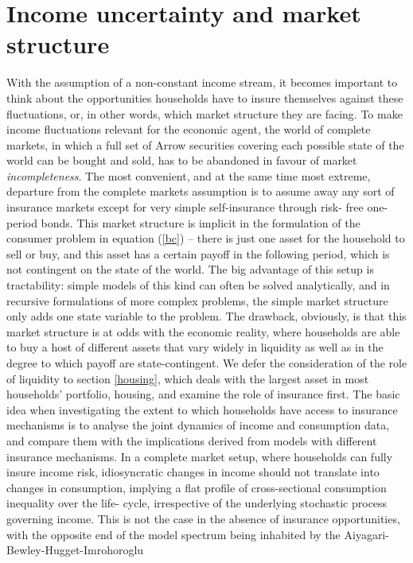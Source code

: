 \section{Income uncertainty and market structure}
With the assumption of a non-constant income stream, it becomes important to 
think about the opportunities households have to insure themselves against
these fluctuations, or, in other words, which market structure they are facing.
To make income fluctuations relevant for the economic agent, the world of 
complete markets, in which a full set of Arrow securities covering each possible
state of the world can be bought and sold, has to be abandoned in favour of 
market \textit{incompleteness}. The most convenient, and at the same time most
extreme, departure from the complete markets assumption is to assume away any
sort of insurance markets except for very simple self-insurance through risk-
free one-period bonds. This market structure is implicit in the formulation of
the consumer problem in equation (\ref{bc}) -- there is just one asset for the 
household to sell or buy, and this asset has a certain payoff in the following 
period, which is not contingent on the state of the world. The big advantage of 
this setup is tractability: simple models of this kind can often be solved 
analytically, and in recursive formulations of more complex problems, the simple
market structure only adds one state variable to the problem. The drawback, 
obviously, is that this market structure is at odds with the economic reality,
where households are able to buy a host of different assets that vary widely 
in liquidity as well as in the degree to which payoff are state-contingent.
We defer the consideration of the role of liquidity to section \ref{housing}, 
which deals with the largest asset in most households' portfolio, housing, and
examine the role of insurance first. The basic idea when investigating the 
extent to which households have access to insurance mechanisms is to analyse
the joint dynamics of income and consumption data, and compare them with the
implications derived from models with different insurance mechanisms. In a 
complete market setup, where households can fully insure income risk, 
idiosyncratic changes in income should not translate into changes in consumption,
implying a flat profile of cross-sectional consumption inequality over the life-
cycle, irrespective of the underlying stochastic process governing income. This 
is not the case in the absence of insurance opportunities, with the opposite 
end of the model spectrum being inhabited by the Aiyagari-Bewley-Hugget-Imrohoroglu
